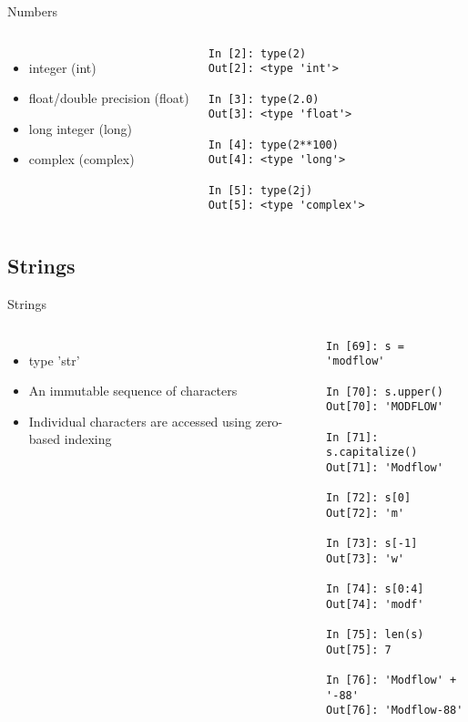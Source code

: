 \documentclass{beamer}
\begin{document}
\begin{frame}[fragile]{Numbers}
\begin{columns}[c]
\column{2.5in}
\begin{itemize}
\item{integer (int)}
\item{float/double precision (float)}
\item{long integer (long)}
\item{complex (complex)}
\end{itemize}

\column{2.5in}
\begin{lstlisting}
In [2]: type(2)
Out[2]: <type 'int'>

In [3]: type(2.0)
Out[3]: <type 'float'>

In [4]: type(2**100)
Out[4]: <type 'long'>

In [5]: type(2j)
Out[5]: <type 'complex'>
\end{lstlisting}
\end{columns}
\end{frame}


\subsection{Strings}

\begin{frame}[fragile]{Strings}
\begin{columns}[c]
\column{2.5in}
\begin{itemize}
\item{type 'str'}
\item{An immutable sequence of characters}
\item{Individual characters are accessed using zero-based indexing}
\end{itemize}

\column{2.5in}
\tiny
\begin{lstlisting}
In [69]: s = 'modflow'

In [70]: s.upper()
Out[70]: 'MODFLOW'

In [71]: s.capitalize()
Out[71]: 'Modflow'

In [72]: s[0]
Out[72]: 'm'

In [73]: s[-1]
Out[73]: 'w'

In [74]: s[0:4]
Out[74]: 'modf'

In [75]: len(s)
Out[75]: 7

In [76]: 'Modflow' + '-88'
Out[76]: 'Modflow-88'
\end{lstlisting}
\end{columns}
\end{frame}
\end{document}
